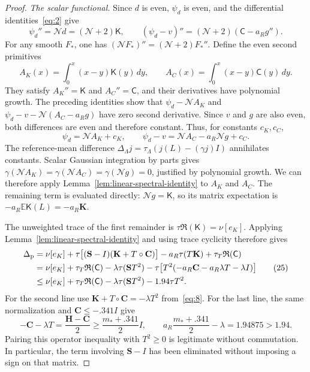 \begin{proof}
\smallskip\noindent\emph{The scalar functional.}
Since \(d\) is even, \(\psi_d\) is even, and the differential
identities~\eqref{eq:2} give
\[
 \psi_d''=\mathcal N d=(\mathcal N+2)\mathsf K,
 \qquad
 (\psi_d-v)''=(\mathcal N+2)(\mathsf C-a_R g'').
\]
For any smooth \(F_*\), one has
\((\mathcal N F_*)''=(\mathcal N+2)F_*''\).
Define the even second primitives
\[
 A_K(x)=\int_0^x(x-y)\mathsf K(y)\,dy,\qquad
 A_C(x)=\int_0^x(x-y)\mathsf C(y)\,dy.
\]
They satisfy \(A_K''=\mathsf K\) and \(A_C''=\mathsf C\), and their
derivatives have polynomial growth. The preceding identities show that
\(\psi_d-\mathcal N A_K\) and
\(\psi_d-v-\mathcal N(A_C-a_Rg)\) have zero second derivative.
Since \(v\) and \(g\) are also even, both differences are even and
therefore constant. Thus, for constants \(c_K,c_C\),
\[
 \psi_d=\mathcal N A_K+c_K,\qquad
 \psi_d-v=\mathcal N A_C-a_R\mathcal N g+c_C.
\]
The reference-mean difference
\(\Delta_\Lambda j=\tau_\Lambda(j(L)-(\gamma j)I)\)
annihilates constants. Scalar Gaussian integration by parts gives
\(\gamma(\mathcal N A_K)=\gamma(\mathcal N A_C)
=\gamma(\mathcal N g)=0\), justified by polynomial growth.
We can therefore apply Lemma~\ref{lem:linear-spectral-identity} to
\(A_K\) and \(A_C\). The remaining term is evaluated directly:
\(\mathcal N g=\mathsf K\), so its matrix expectation is
\(-a_R\mathbb E\mathsf K(L)=-a_R\mathbf K\).

The unweighted trace of the first remainder is
\(\tau\mathfrak R(\mathsf K)=\nu[e_K]\).  Applying
Lemma~\ref{lem:linear-spectral-identity} and using trace cyclicity therefore
gives
\[
 \begin{aligned}
 \Delta_{\rm p}
 &=\nu[e_K]+\tau\bigl[(\mathbf S-I)
                   (\mathbf K+T\circ\mathbf C)\bigr]
             -a_R\tau(T\mathbf K)+\tau_T\mathfrak R(\mathsf C)\\
 &=\nu[e_K]+\tau_T\mathfrak R(\mathsf C)
             -\lambda\tau(\mathbf S T^2)
             -\tau\bigl[T^2(-a_R\mathbf C-a_R\lambda T-\lambda I)\bigr]\\
 &\le\nu[e_K]+\tau_T\mathfrak R(\mathsf C)
             -\lambda\tau(\mathbf S T^2)-1.94\tau T^2.
 \end{aligned}
 \tag{25}\label{eq:25}
\]
For the second line use
\(\mathbf K+T\circ\mathbf C=-\lambda T^2\) from~\eqref{eq:8}.
For the last line, the same normalization and
\(\mathbf C\le-.341I\) give
\[
 -\mathbf C-\lambda T
    =\frac{\mathbf H-\mathbf C}{2}
    \ge\frac{m_*+.341}{2}I,
 \qquad
 a_R\frac{m_*+.341}{2}-\lambda=1.94875>1.94.
\]
Pairing this operator inequality with \(T^2\ge0\) is legitimate without
commutation.  In particular, the term involving \(\mathbf S-I\) has been
eliminated without imposing a sign on that matrix.


\end{proof}

